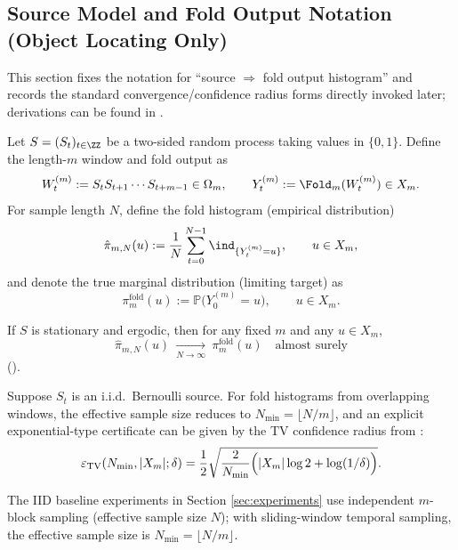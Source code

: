 \subsection{Source Model and Fold Output Notation (Object Locating Only)}\label{subsec:histogram-convergence-natural-sources}
This section fixes the notation for ``source $\Rightarrow$ fold output histogram'' and records the standard convergence/confidence radius forms directly invoked later; derivations can be found in \cite{WaltersErgodicTheory,WeissmanEtAl2003L1Empirical}.

\begin{definition}\label{def:source-and-fold-output}
Let $S=(S_t)_{t\in\ZZ}$ be a two-sided random process taking values in $\{0,1\}$. Define the length-$m$ window and fold output as
\[
W_t^{(m)}:=S_tS_{t+1}\cdots S_{t+m-1}\in\Omega_m,
\qquad
Y_t^{(m)}:=\Fold_m(W_t^{(m)})\in X_m.
\]
For sample length $N$, define the fold histogram (empirical distribution)
\[
\hat{\pi}_{m,N}(u):=\frac{1}{N}\sum_{t=0}^{N-1}\ind_{\{Y_t^{(m)}=u\}},
\qquad u\in X_m,
\]
and denote the true marginal distribution (limiting target) as
\[
\pi_m^{\mathrm{fold}}(u):=\mathbb{P}\bigl(Y_0^{(m)}=u\bigr),\qquad u\in X_m.
\]
\end{definition}

If $S$ is stationary and ergodic, then for any fixed $m$ and any $u\in X_m$,
\[
\hat{\pi}_{m,N}(u)\ \xrightarrow[N\to\infty]{}\ \pi_m^{\mathrm{fold}}(u)
\quad\text{almost surely}
\]
(\cite{WaltersErgodicTheory}).

Suppose $S_t$ is an i.i.d.\ Bernoulli source. For fold histograms from overlapping windows, the effective sample size reduces to $N_{\min}=\lfloor N/m\rfloor$, and an explicit exponential-type certificate can be given by the TV confidence radius from \cite{WeissmanEtAl2003L1Empirical}:
\[
\varepsilon_{\mathrm{TV}}(N_{\min},|X_m|;\delta)=\frac12\sqrt{\frac{2}{N_{\min}}\Bigl(|X_m|\log 2+\log(1/\delta)\Bigr)}.
\]

\begin{remark}\label{rem:iid-overlap-vs-blocks}
The IID baseline experiments in Section \ref{sec:experiments} use independent $m$-block sampling (effective sample size $N$); with sliding-window temporal sampling, the effective sample size is $N_{\min}=\lfloor N/m\rfloor$.
\end{remark}
